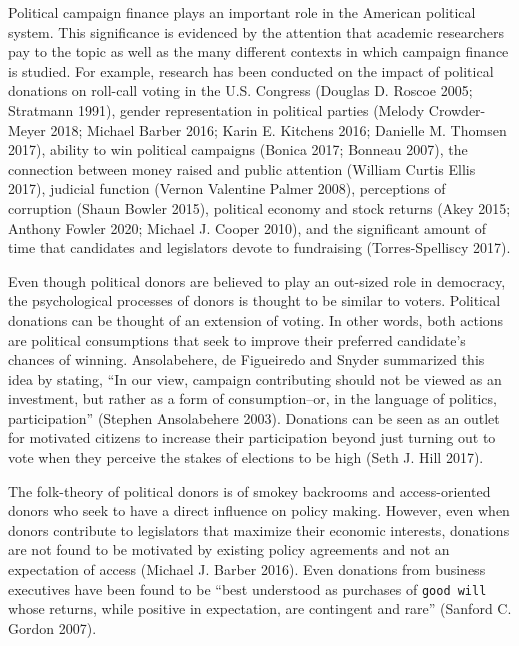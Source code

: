 \documentclass[11pt,]{article}
\begin{document}
\vskip -8.5pt



\noindent \doublespacing 

Political campaign finance plays an important role in the American
political system. This significance is evidenced by the attention that
academic researchers pay to the topic as well as the many different
contexts in which campaign finance is studied. For example, research has
been conducted on the impact of political donations on roll-call voting
in the U.S. Congress (Douglas D. Roscoe 2005; Stratmann 1991), gender
representation in political parties (Melody Crowder-Meyer 2018; Michael
Barber 2016; Karin E. Kitchens 2016; Danielle M. Thomsen 2017), ability
to win political campaigns (Bonica 2017; Bonneau 2007), the connection
between money raised and public attention (William Curtis Ellis 2017),
judicial function (Vernon Valentine Palmer 2008), perceptions of
corruption (Shaun Bowler 2015), political economy and stock returns
(Akey 2015; Anthony Fowler 2020; Michael J. Cooper 2010), and the
significant amount of time that candidates and legislators devote to
fundraising (Torres-Spelliscy 2017).

Even though political donors are believed to play an out-sized role in
democracy, the psychological processes of donors is thought to be
similar to voters. Political donations can be thought of an extension of
voting. In other words, both actions are political consumptions that
seek to improve their preferred candidate's chances of winning.
Ansolabehere, de Figueiredo and Snyder summarized this idea by stating,
``In our view, campaign contributing should not be viewed as an
investment, but rather as a form of consumption--or, in the language of
politics, participation'' (Stephen Ansolabehere 2003). Donations can be
seen as an outlet for motivated citizens to increase their participation
beyond just turning out to vote when they perceive the stakes of
elections to be high (Seth J. Hill 2017).

The folk-theory of political donors is of smokey backrooms and
access-oriented donors who seek to have a direct influence on policy
making. However, even when donors contribute to legislators that
maximize their economic interests, donations are not found to be
motivated by existing policy agreements and not an expectation of access
(Michael J. Barber 2016). Even donations from business executives have
been found to be ``best understood as purchases of \texttt{good\ will}
whose returns, while positive in expectation, are contingent and rare''
(Sanford C. Gordon 2007).
\end{document}
